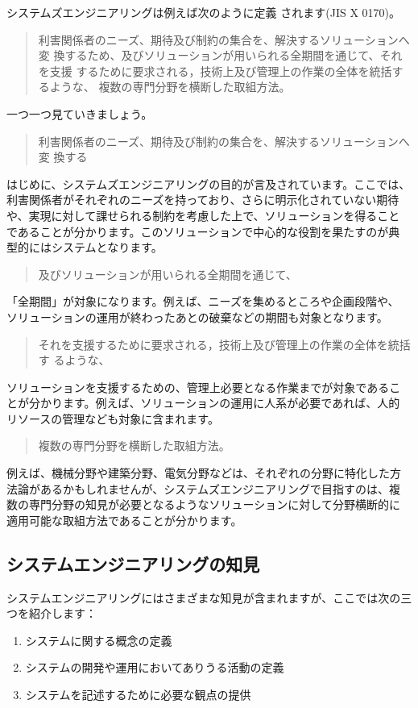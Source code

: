 システムズエンジニアリングは例えば次のように定義
されます(\lbrack JIS X 0170\rbrack)。
\begin{quote}
  利害関係者のニーズ、期待及び制約の集合を、解決するソリューションへ変
  換するため、及びソリューションが用いられる全期間を通じて、それを支援
  するために要求される，技術上及び管理上の作業の全体を統括するような、
  複数の専門分野を横断した取組方法。
\end{quote}
一つ一つ見ていきましょう。
\begin{quote}
  利害関係者のニーズ、期待及び制約の集合を、解決するソリューションへ変
  換する
\end{quote}
はじめに、システムズエンジニアリングの目的が言及されています。ここでは、
利害関係者がそれぞれのニーズを持っており、さらに明示化されていない期待
や、実現に対して課せられる制約を考慮した上で、ソリューションを得ること
であることが分かります。このソリューションで中心的な役割を果たすのが典
型的にはシステムとなります。
\begin{quote}
  及びソリューションが用いられる全期間を通じて、
\end{quote}
「全期間」が対象になります。例えば、ニーズを集めるところや企画段階や、
ソリューションの運用が終わったあとの破棄などの期間も対象となります。
\begin{quote}
  それを支援するために要求される，技術上及び管理上の作業の全体を統括す
  るような、
\end{quote}
ソリューションを支援するための、管理上必要となる作業までが対象であるこ
とが分かります。例えば、ソリューションの運用に人系が必要であれば、人的
リソースの管理なども対象に含まれます。
\begin{quote}
  複数の専門分野を横断した取組方法。
\end{quote}
例えば、機械分野や建築分野、電気分野などは、それぞれの分野に特化した方
法論があるかもしれませんが、システムズエンジニアリングで目指すのは、複
数の専門分野の知見が必要となるようなソリューションに対して分野横断的に
適用可能な取組方法であることが分かります。
\subsection{システムエンジニアリングの知見}

システムエンジニアリングにはさまざまな知見が含まれますが、ここでは次の三つを紹介します：

\begin{enumerate}
    \item システムに関する概念の定義
    \item システムの開発や運用においてありうる活動の定義
    \item システムを記述するために必要な観点の提供
\end{enumerate}

